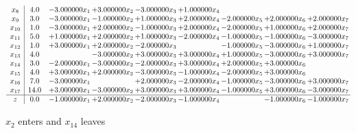 \documentclass[10pt]{article}
\begin{document}
\[\begin{array}{c| c c@{\hskip 2pt} c@{\hskip 2pt} c@{\hskip 2pt} c@{\hskip 2pt} c@{\hskip 2pt} c@{\hskip 2pt} c@{\hskip 2pt} }
 x_{8}   &  4.0 & -3.000000 x_{1} & + 3.000000 x_{2} & -3.000000 x_{3} & + 1.000000 x_{4} &    &    &   \\
 x_{9}   &  3.0 & -3.000000 x_{1} & -1.000000 x_{2} & + 1.000000 x_{3} & + 2.000000 x_{4} & -2.000000 x_{5} & + 2.000000 x_{6} & + 2.000000 x_{7}\\
 x_{10}   &  1.0 & -3.000000 x_{1} & + 2.000000 x_{2} & -1.000000 x_{3} & + 2.000000 x_{4} & -2.000000 x_{5} & + 1.000000 x_{6} & + 2.000000 x_{7}\\
 x_{11}   &  5.0 & + 1.000000 x_{1} & + 2.000000 x_{2} & + 1.000000 x_{3} & -2.000000 x_{4} & -1.000000 x_{5} & -1.000000 x_{6} & -3.000000 x_{7}\\
 x_{12}   &  1.0 & + 3.000000 x_{1} & + 2.000000 x_{2} & -2.000000 x_{3} &   & -1.000000 x_{5} & -3.000000 x_{6} & + 1.000000 x_{7}\\
 x_{13}   &  4.0  &   & -3.000000 x_{2} & + 3.000000 x_{3} & + 3.000000 x_{4} & + 1.000000 x_{5} & -3.000000 x_{6} & + 3.000000 x_{7}\\
 x_{14}   &  3.0 & -2.000000 x_{1} & -3.000000 x_{2} & -2.000000 x_{3} & + 3.000000 x_{4} & + 2.000000 x_{5} & + 3.000000 x_{6} &   \\
 x_{15}   &  4.0 & + 3.000000 x_{1} & + 2.000000 x_{2} & -3.000000 x_{3} & -1.000000 x_{4} & -2.000000 x_{5} & + 3.000000 x_{6} &   \\
 x_{16}   &  7.0 & -3.000000 x_{1} &   & + 2.000000 x_{3} & -2.000000 x_{4} & -1.000000 x_{5} & -3.000000 x_{6} & + 3.000000 x_{7}\\
 x_{17}   &  14.0 & + 3.000000 x_{1} & -3.000000 x_{2} & + 3.000000 x_{3} & + 3.000000 x_{4} & -1.000000 x_{5} & + 3.000000 x_{6} & -3.000000 x_{7}\\
\hline
z    &  0.0 & -1.000000 x_{1} & + 2.000000 x_{2} & -2.000000 x_{3} & -1.000000 x_{4} &   & -1.000000 x_{6} & -1.000000 x_{7}\\
\end{array}\]


 $ x_{2} $ enters and $ x_{14} $ leaves 
\end{document}
